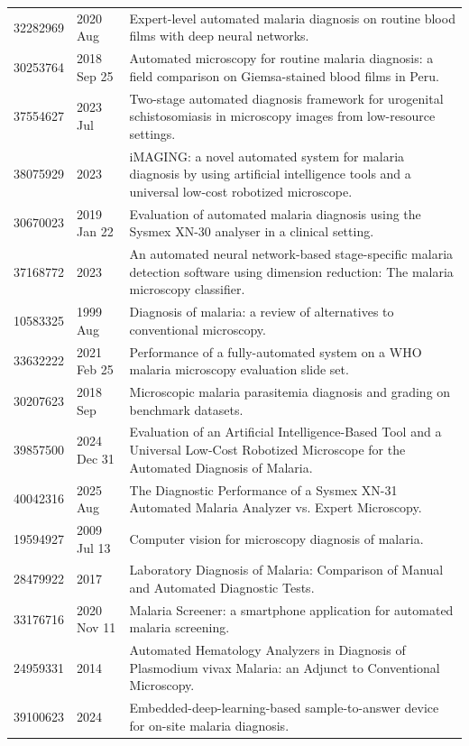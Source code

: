 \begin{longtable}{llp{9.5cm}}
32282969 & 2020 Aug & Expert-level automated malaria diagnosis on routine blood films with deep neural networks. \\
30253764 & 2018 Sep 25 & Automated microscopy for routine malaria diagnosis: a field comparison on Giemsa-stained blood films in Peru. \\
37554627 & 2023 Jul & Two-stage automated diagnosis framework for urogenital schistosomiasis in microscopy images from low-resource settings. \\
38075929 & 2023 & iMAGING: a novel automated system for malaria diagnosis by using artificial intelligence tools and a universal low-cost robotized microscope. \\
30670023 & 2019 Jan 22 & Evaluation of automated malaria diagnosis using the Sysmex XN-30 analyser in a clinical setting. \\
37168772 & 2023 & An automated neural network-based stage-specific malaria detection software using dimension reduction: The malaria microscopy classifier. \\
10583325 & 1999 Aug & Diagnosis of malaria: a review of alternatives to conventional microscopy. \\
33632222 & 2021 Feb 25 & Performance of a fully-automated system on a WHO malaria microscopy evaluation slide set. \\
30207623 & 2018 Sep & Microscopic malaria parasitemia diagnosis and grading on benchmark datasets. \\
39857500 & 2024 Dec 31 & Evaluation of an Artificial Intelligence-Based Tool and a Universal Low-Cost Robotized Microscope for the Automated Diagnosis of Malaria. \\
40042316 & 2025 Aug & The Diagnostic Performance of a Sysmex XN-31 Automated Malaria Analyzer vs. Expert Microscopy. \\
19594927 & 2009 Jul 13 & Computer vision for microscopy diagnosis of malaria. \\
28479922 & 2017 & Laboratory Diagnosis of Malaria: Comparison of Manual and Automated Diagnostic Tests. \\
33176716 & 2020 Nov 11 & Malaria Screener: a smartphone application for automated malaria screening. \\
24959331 & 2014 & Automated Hematology Analyzers in Diagnosis of Plasmodium vivax Malaria: an Adjunct to Conventional Microscopy. \\
39100623 & 2024 & Embedded-deep-learning-based sample-to-answer device for on-site malaria diagnosis. \\

\end{longtable}
